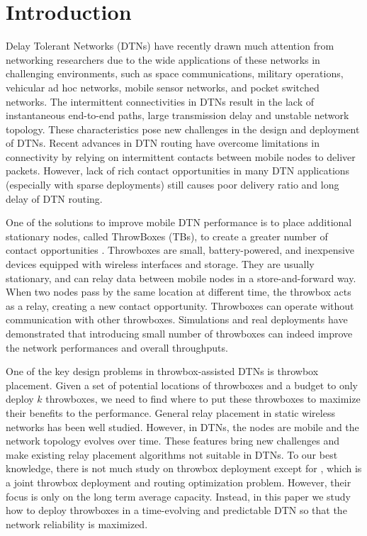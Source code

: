 \documentclass[10pt,conference,compsocconf,letterpaper]{IEEEtran}
\begin{document}
\section{Introduction}
\label{sec:intro}

Delay Tolerant Networks (DTNs) have recently drawn much attention from networking
researchers due to the wide applications of these networks in challenging environments, such as
space communications, military operations, vehicular ad hoc networks, mobile sensor networks, and pocket switched networks.
The intermittent connectivities in DTNs result in the lack of instantaneous end-to-end paths, large transmission
delay and unstable network topology. These characteristics pose new challenges in the design and deployment of DTNs.
Recent advances in DTN routing \cite{Bubble,1288115,VMAC08} have overcome limitations in connectivity
by relying on intermittent contacts between mobile nodes to deliver packets. However, lack of
rich contact opportunities in many DTN applications (especially with sparse deployments)
still causes poor delivery ratio and long delay of DTN routing.

One of the solutions to improve mobile DTN performance is to place additional stationary nodes, called
ThrowBoxes (TBs), to create a greater number of contact opportunities \cite{WYMMBE-MASS2006,Banerjee10,Ibrahim:2007,GH10,Ibrahim:2009,6134049}. Throwboxes are small, battery-powered,
and inexpensive devices equipped with wireless interfaces and storage. They are usually stationary, and can relay data
between mobile nodes in a store-and-forward way. When two nodes pass by the same location at different
time, the throwbox acts as a relay, creating a new contact opportunity. Throwboxes  can operate without
communication with other throwboxes. Simulations and real deployments \cite{Banerjee10,Ibrahim:2007,GH10,Ibrahim:2009,6134049} have demonstrated that introducing small number of throwboxes can indeed improve the network performances and overall throughputs.

One of the key design problems in throwbox-assisted DTNs is throwbox placement. Given a set of potential locations
of throwboxes and a budget to only deploy $k$ throwboxes, we need to find where to put these throwboxes to maximize
their benefits to the performance.
General relay placement in static wireless networks \cite{lloyd2007relay,cheng2008relay} has been
well studied. However, in DTNs, the nodes are mobile and the network topology evolves over time. These features bring new
challenges and make existing relay placement algorithms not suitable in DTNs.  To our best knowledge,
there is not much study on throwbox deployment except for \cite{WYMMBE-MASS2006}, which is a joint throwbox deployment
and routing optimization problem. However, their focus is only on the long term average capacity. Instead, in this paper we
study how to deploy throwboxes in a time-evolving and predictable DTN so that the network reliability is
maximized.
\end{document}
